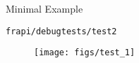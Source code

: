 \begin{frame}{Minimal Example}

    \footnotesize
    \texttt{frapi/debugtests/test2}

  \begin{figure}[h]
    \texttt{[image: figs/test\_1]}
  \end{figure}  

\end{frame}

